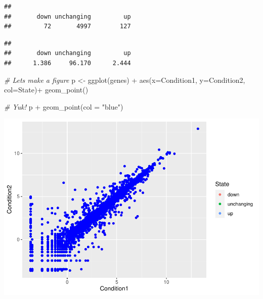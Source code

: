 \documentclass[
]{article}
\newenvironment{Shaded}{\begin{snugshade}}{\end{snugshade}}
\newcommand{\AttributeTok}[1]{\textcolor[rgb]{0.77,0.63,0.00}{#1}}
\newcommand{\CommentTok}[1]{\textcolor[rgb]{0.56,0.35,0.01}{\textit{#1}}}
\newcommand{\DecValTok}[1]{\textcolor[rgb]{0.00,0.00,0.81}{#1}}
\newcommand{\FunctionTok}[1]{\textcolor[rgb]{0.00,0.00,0.00}{#1}}
\newcommand{\NormalTok}[1]{#1}
\newcommand{\OtherTok}[1]{\textcolor[rgb]{0.56,0.35,0.01}{#1}}
\newcommand{\SpecialCharTok}[1]{\textcolor[rgb]{0.00,0.00,0.00}{#1}}
\newcommand{\StringTok}[1]{\textcolor[rgb]{0.31,0.60,0.02}{#1}}
\begin{document}
\begin{verbatim}
## 
##       down unchanging         up 
##         72       4997        127
\end{verbatim}

\begin{Shaded}
\end{Shaded}

\begin{verbatim}
## 
##       down unchanging         up 
##      1.386     96.170      2.444
\end{verbatim}

\begin{Shaded}
\begin{Highlighting}[]
\CommentTok{\# Let\textquotesingle{}s make a figure}
\NormalTok{p }\OtherTok{\textless{}{-}} \FunctionTok{ggplot}\NormalTok{(genes) }\SpecialCharTok{+} 
  \FunctionTok{aes}\NormalTok{(}\AttributeTok{x=}\NormalTok{Condition1, }\AttributeTok{y=}\NormalTok{Condition2, }\AttributeTok{col=}\NormalTok{State)}\SpecialCharTok{+}
  \FunctionTok{geom\_point}\NormalTok{()}


\CommentTok{\# Yuk!}
\NormalTok{p }\SpecialCharTok{+} \FunctionTok{geom\_point}\NormalTok{(}\AttributeTok{col =} \StringTok{"blue"}\NormalTok{)}
\end{Highlighting}
\end{Shaded}

\includegraphics{class05_files/figure-latex/unnamed-chunk-1-3.pdf}
\end{document}
